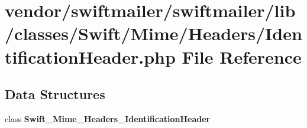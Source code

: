 \section{vendor/swiftmailer/swiftmailer/lib/classes/\+Swift/\+Mime/\+Headers/\+Identification\+Header.php File Reference}
\label{_identification_header_8php}
\subsection*{Data Structures}
\begin{DoxyCompactItemize}
\item 
class {\bf Swift\+\_\+\+Mime\+\_\+\+Headers\+\_\+\+Identification\+Header}
\end{DoxyCompactItemize}
